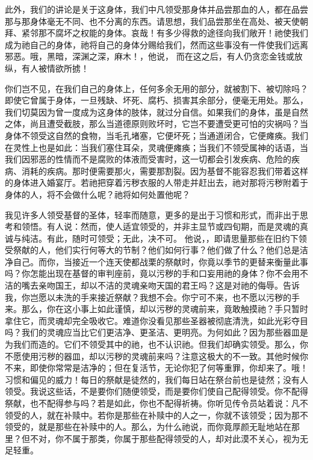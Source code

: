 此外，我们的讲论是关于这身体，我们中凡领受那身体并品尝那血的人，都在品尝那与那身体毫无不同、也不分离的东西。请思想，我们品尝那坐在高处、被天使朝拜、紧邻那不腐坏之权能的身体。哀哉！有多少得救的途径向我们敞开！祂使我们成为祂自己的身体，祂将自己的身体分赐给我们，然而这些事没有一件使我们远离邪恶。哦，黑暗，深渊之深，麻木！，他说， 而在这之后，有人仍贪恋金钱或放纵，有人被情欲所掳！\par

你们岂不见，在我们自己的身体上，任何多余无用的部分，就被割下、被切除吗？即使它曾属于身体，一旦残缺、坏死、腐朽、损害其余部分，便毫无用处。那么，我们切莫因为曾一度成为这身体的肢体，就过分自信。如果我们的身体，虽是自然之体，尚且遭受截肢，那么当道德原则败坏时，它岂不要遭受更可怕的灾祸吗？当身体不领受这自然的食物，当毛孔堵塞，它便坏死；当通道闭合，它便瘫痪。我们在灵性上也是如此：当我们塞住耳朵，灵魂便瘫痪；当我们不领受属神的话语，当我们因邪恶的性情而不是腐败的体液而受害时，这一切都会引发疾病、危险的疾病、消耗的疾病。那时便需要那火，需要那割裂。因为基督不能容忍我们带着这样的身体进入婚宴厅。若祂把穿着污秽衣服的人带走并赶出去，祂对那将污秽附着于身体的人，将不会做什么呢？祂将如何处置他呢？\par

我见许多人领受基督的圣体，轻率而随意，更多的是出于习惯和形式，而非出于思考和领悟。有人说：然而，使人适宜领受的，并非主显节或四旬期，而是灵魂的真诚与纯洁。有此，随时可领受；无此，决不可。  他说，，即请思量那些在旧约下领受祭献的人，他们实行何等大的节制？他们如何行事？他们做了什么？他们总是洁净自己。而你，当接近一个连天使都战栗的祭献时，你竟以季节的更替来衡量此事吗？你怎能出现在基督的审判座前，竟以污秽的手和口妄用祂的身体？你不会用不洁的嘴去亲吻国王，却以不洁的灵魂亲吻天国的君王吗？这是对祂的侮辱。告诉我，你岂愿以未洗的手来接近祭献？我想不会。你宁可不来，也不愿以污秽的手来。那么，你在这小事上如此谨慎，却以污秽的灵魂前来，竟敢触摸祂？手只暂时拿住它，而灵魂却完全吸收它。难道你没看见那些圣器被彻底清洗，如此光彩夺目吗？我们的灵魂应当比它们更洁净、更圣洁、更明亮。为何如此？因为那些器皿是为我们而造的。它们不领受其中的祂，也不认识祂。但我们却确实领受。那么，你不愿使用污秽的器皿，却以污秽的灵魂前来吗？注意这极大的不一致。其他时候你不来，即使你常常是洁净的；但在复活节，无论你犯了何等重罪，你却来了。哦！习惯和偏见的威力！每日的祭献是徒然的，我们每日站在祭台前也是徒然；没有人领受。我说这些话，不是要你们随便领受，而是要你们使自己配得领受。你不配得祭献，也不配得参与吗？若是如此，你也不配得祈祷。你听见传令员站着说：凡不领受的人，就在补赎中。若你是那些在补赎中的人之一，你就不该领受；因为那不领受的，就是那些在补赎中的人。那么，为什么祂说，而你竟厚颜无耻地站在那里？但不对，你不属于那类，你属于那些配得领受的人，却对此漠不关心，视为无足轻重。\par

